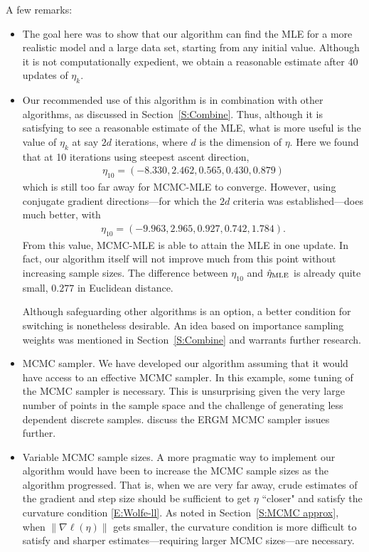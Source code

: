 A few remarks:
\begin{itemize}
\item The goal here was to show that our algorithm can find the MLE for a more realistic model and a large data set, starting from any initial value.
Although it is not computationally expedient, 
we obtain a reasonable estimate after 40 updates of $\eta_k$.  

\item Our recommended use of this algorithm is in combination with other algorithms,
as discussed in Section~\ref{S:Combine}.  Thus, although it is satisfying to see a reasonable estimate of the MLE, what is more useful is the value of $\eta_k$ 
at say $2d$ iterations, where $d$ is the dimension of $\eta$.  
Here we found that at 10 iterations using steepest ascent direction,
\begin{align*}
	\eta_{10} =( -8.330,  2.462,  0.565,  0.430,  0.879) 
\end{align*}
which is still too far away for MCMC-MLE to converge.
However, using conjugate gradient directions---for which the $2d$ criteria was
established---does much better, with
\begin{align*}
	\eta_{10} =( -9.963,  2.965,  0.927,  0.742,  1.784).
\end{align*}
From this value, MCMC-MLE is able to attain the MLE in one update.  In fact,
our algorithm itself will not improve much from this point without increasing sample
sizes.  The difference between $\eta_{10}$ and $\hat{\eta}_{\textrm{MLE}}$ is already quite small,
 $0.277$ in Euclidean distance.

Although safeguarding other algorithms is an option, a better condition
for switching is nonetheless desirable.  An idea based on importance sampling weights was mentioned
in Section~\ref{S:Combine} and warrants further research.

\item MCMC sampler.  We have developed our algorithm assuming that it would have access
to an effective MCMC sampler.  In this example, some tuning of the MCMC
sampler is necessary.  
This is unsurprising given the very large number of points in the sample space 
and the challenge of generating less dependent discrete samples. 
\citet{ergm,Morris:2008} discuss the ERGM MCMC sampler issues further.


\item Variable MCMC sample sizes.  A more pragmatic way to implement our 
algorithm would have
been to increase the MCMC sample sizes as the algorithm progressed.  That is, when
we are very far away, crude estimates of the gradient and step size should be sufficient
to get $\eta$ ``closer" and satisfy the curvature condition \eqref{E:Wolfe-ll}.
As noted in Section~\ref{S:MCMC approx}, when $\lVert \nabla \ell(\eta) \rVert$ gets
smaller, the curvature condition is more difficult to satisfy and sharper estimates---requiring larger MCMC sizes---are necessary.
\end{itemize}

